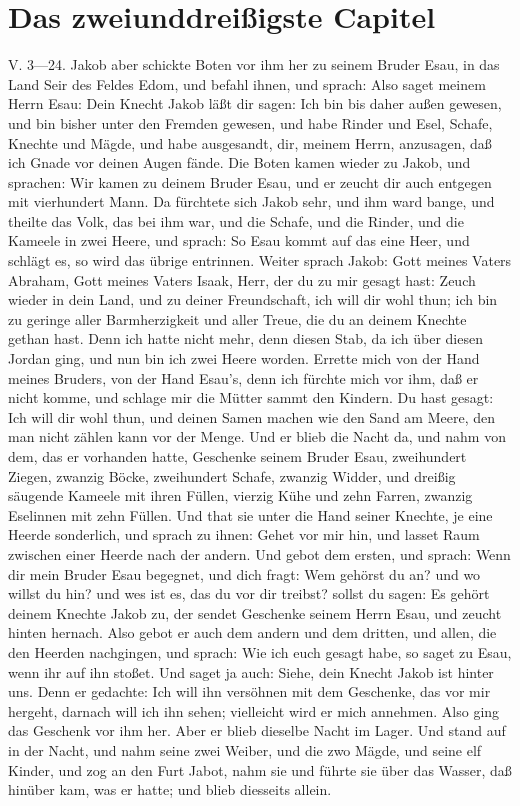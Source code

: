 \section{Das zweiunddreißigste Capitel}
V. 3—24. Jakob aber schickte Boten vor ihm her zu seinem Bruder Esau, in das Land Seir des Feldes Edom, und befahl ihnen, und sprach: Also saget meinem Herrn Esau: Dein Knecht Jakob läßt dir sagen: Ich bin bis daher außen gewesen, und bin bisher unter den Fremden gewesen, und habe Rinder und Esel, Schafe, Knechte und Mägde, und habe ausgesandt, dir, meinem Herrn, anzusagen, daß ich Gnade vor deinen Augen fände. Die Boten kamen wieder zu Jakob, und sprachen: Wir kamen zu deinem Bruder Esau, und er zeucht dir auch entgegen mit vierhundert Mann. Da fürchtete sich Jakob sehr, und ihm ward bange, und theilte das Volk, das bei ihm war, und die Schafe, und die Rinder, und die Kameele in zwei Heere, und sprach: So Esau kommt auf das eine Heer, und schlägt es, so wird das übrige entrinnen. Weiter sprach Jakob: Gott meines Vaters Abraham, Gott meines Vaters Isaak, Herr, der du zu mir gesagt hast: Zeuch wieder in dein Land, und zu deiner Freundschaft, ich will dir wohl thun; ich bin zu geringe aller Barmherzigkeit und aller Treue, die du an deinem Knechte gethan hast. Denn ich hatte nicht mehr, denn diesen Stab, da ich über diesen Jordan ging, und nun bin ich zwei Heere worden. Errette mich von der Hand meines Bruders, von der Hand Esau's, denn ich fürchte mich vor ihm, daß er nicht komme, und schlage mir die Mütter sammt den Kindern. Du hast gesagt: Ich will dir wohl thun, und deinen Samen machen wie den Sand am Meere, den man nicht zählen kann vor der Menge. Und er blieb die Nacht da, und nahm von dem, das er vorhanden hatte, Geschenke seinem Bruder Esau, zweihundert Ziegen, zwanzig Böcke, zweihundert Schafe, zwanzig Widder, und dreißig säugende Kameele mit ihren Füllen, vierzig Kühe und zehn Farren, zwanzig Eselinnen mit zehn Füllen. Und that sie unter die Hand seiner Knechte, je eine Heerde sonderlich, und sprach zu ihnen: Gehet vor mir hin, und lasset Raum zwischen einer Heerde nach der andern. Und gebot dem ersten, und sprach: Wenn dir mein Bruder Esau begegnet, und dich fragt: Wem gehörst du an? und wo willst du hin? und wes ist es, das du vor dir treibst? sollst du sagen: Es gehört deinem Knechte Jakob zu, der sendet Geschenke seinem Herrn Esau, und zeucht hinten hernach. Also gebot er auch dem andern und dem dritten, und allen, die den Heerden nachgingen, und sprach: Wie ich euch gesagt habe, so saget zu Esau, wenn ihr auf ihn stoßet. Und saget ja auch: Siehe, dein Knecht Jakob ist hinter uns. Denn er gedachte: Ich will ihn versöhnen mit dem Geschenke, das vor mir hergeht, darnach will ich ihn sehen; vielleicht wird er mich annehmen. Also ging das Geschenk vor ihm her. Aber er blieb dieselbe Nacht im Lager. Und stand auf in der Nacht, und nahm seine zwei Weiber, und die zwo Mägde, und seine elf Kinder, und zog an den Furt Jabot, nahm sie und führte sie über das Wasser, daß hinüber kam, was er hatte; und blieb diesseits allein.

